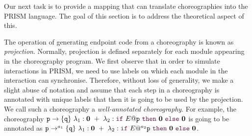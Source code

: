 Our next task is to provide a mapping that can translate
choreographies into the PRISM language. The goal of this section is to
address the theoretical aspect of this.

  The operation of generating
endpoint code from a choreography is known as {\em
  projection}. Normally, projection is defined separately for each
module appearing in the choreography program. We first observe that in
order to simulate interactions in PRISM, we need to use labels on
which each module in the interaction can synchronise. Therefore,
without loss of generality, we make a slight abuse of notation and
assume that each step in a choreography is annotated with unique
labels that then it is going to be used by the projection. We call
such a choreography a {\em well-annotated choreography}. For example,
the choreography
$\interactBase{p}{q}\ \lambda_1: \CEnd \ +\ \lambda_2: \ifTE
  {E}{p}{\CEnd}{\CEnd}$ is going to be annotated as
  $\interactBasel{p}{a_1}{q}\ \lambda_1: \CEnd \ +\ \lambda_2: \ifTEl
    {E}{a_2}{p}{\CEnd}{\CEnd}$.


%
%

